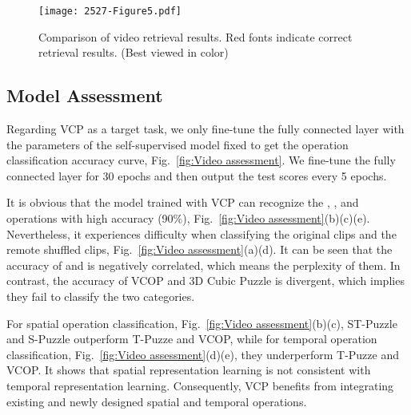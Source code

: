 \documentclass[letterpaper]{article}
\begin{document}
\begin{figure*}[t]
     \centering
     \texttt{[image: 2527-Figure5.pdf]}
     \caption{Comparison of video retrieval results. Red fonts indicate correct retrieval results. (Best viewed in color)}
     \label{fig:video retrieval}
 \end{figure*}
 
\subsection{Model Assessment}
Regarding VCP as a target task, we only fine-tune the fully connected layer with the parameters of the self-supervised model fixed to get the operation classification accuracy curve, Fig.\ \ref{fig:Video assessment}. We fine-tune the fully connected layer for 30 epochs and then output the test scores every 5 epochs.

It is obvious that the model trained with VCP can recognize the , , and  operations with high accuracy (90\%), Fig.\ \ref{fig:Video assessment}(b)(c)(e).
Nevertheless, it experiences difficulty when classifying the original clips and the remote shuffled clips, Fig.\ \ref{fig:Video assessment}(a)(d). 
It can be seen that the accuracy of  and  is negatively correlated, which means the perplexity of them.
In contrast, the accuracy of VCOP and 3D Cubic Puzzle is divergent, which implies they fail to classify the two categories.

For spatial operation classification, Fig.\ \ref{fig:Video assessment}(b)(c), ST-Puzzle and S-Puzzle outperform T-Puzze and VCOP, while for temporal operation classification, Fig.\ \ref{fig:Video assessment}(d)(e), they underperform T-Puzze and VCOP.
It shows that spatial representation learning is not consistent with temporal representation learning. Consequently, VCP benefits from integrating existing and newly designed spatial and temporal operations.
\end{document}
